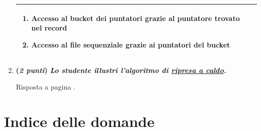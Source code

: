 \documentclass[a4paper]{article}
\begin{document}
\begin{enumerate}
\begin{table}[!htp]
\begin{tabular}{@{} l p{23em} @{}}
\begin{enumerate}
					\item \textbf{Accesso al bucket dei puntatori} grazie al puntatore trovato nel record
					
					\item \textbf{Accesso al file sequenziale} grazie ai puntatori del bucket
				\end{enumerate}\\
				\bottomrule
			\end{tabular}
		\end{table}
		
		\item \textbf{(\emph{2 punti})} \textcolor{Green4}{\textbf{\emph{Lo studente illustri l'algoritmo di \underline{ripresa a caldo}.}}}
		
		Risposta a pagina \pageref{dom: ripresa a caldo}.
	\end{enumerate}\newpage
	
	
	
	
	
	
	
	\section{Indice delle domande}
	
\end{document}
